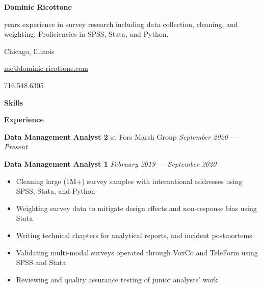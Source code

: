 \documentclass[12pt]{article}
\begin{document}
\begin{vwcol}[widths={0.65,0.35},justify=flush,rule=0pt]
\Huge
\noindent \textbf{Dominic Ricottone}
\normalsize

\vspace{.5em}
 years experience in survey research including data collection, cleaning, and weighting.
Proficiencies in SPSS, Stata, and Python.

\noindent {} Chicago, Illinois

\vspace{.5em}
\noindent {} \href{mailto:me@dominic-ricottone.com}{me@dominic-ricottone.com}

\vspace{.5em}
\noindent {} 716.548.6305
\end{vwcol}

\vspace{.5em}
\large
\noindent \textbf{Skills} \hrulefill
\normalsize

\vspace{.5em}
{}

{}
\tcbox{\strut \LaTeX}
\vspace{1em}

\large
\noindent \textbf{Experience} \hrulefill
\normalsize
\vspace{.5em}

\noindent \textbf{Data Management Analyst 2} at Fors Marsh Group \hfill \textit{September 2020 --- Present}
\vspace{.5em}

\noindent \textbf{Data Management Analyst 1} \hfill \textit{February 2019 --- September 2020}
\begin{itemize}[]
\item Cleaning large (1M+) survey samples with international addresses using SPSS, Stata, and Python
\item Weighting survey data to mitigate design effects and non-response bias using Stata
\item Writing technical chapters for analytical reports, and incident postmortems
\item Validating multi-modal surveys operated through VoxCo and TeleForm using SPSS and Stata
\item Reviewing and quality assurance testing of junior analysts' work
\end{itemize}
\end{document}
